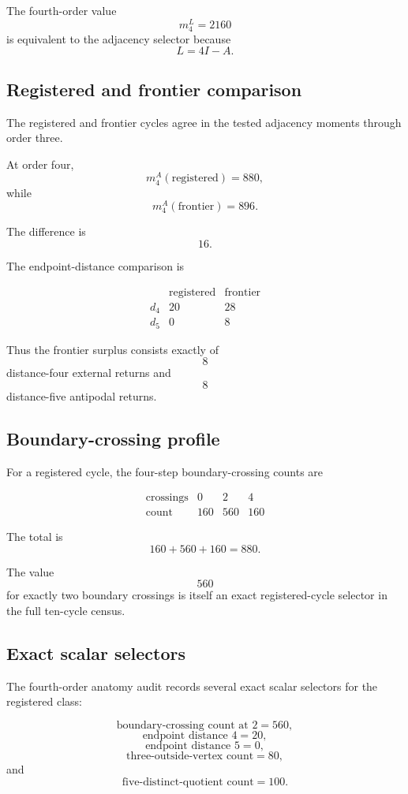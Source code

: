 The fourth-order value
\[
m_4^L=2160
\]
is equivalent to the adjacency selector because
\[
L=4I-A.
\]

\subsection{Registered and frontier comparison}

The registered and frontier cycles agree in the tested adjacency
moments through order three.

At order four,
\[
m_4^A(\text{registered})=880,
\]
while
\[
m_4^A(\text{frontier})=896.
\]

The difference is
\[
16.
\]

The endpoint-distance comparison is

\[
\begin{array}{c|rr}
 & \text{registered} & \text{frontier}\\
\hline
d_4 & 20 & 28\\
d_5 & 0 & 8
\end{array}
\]

Thus the frontier surplus consists exactly of
\[
8
\]
distance-four external returns and
\[
8
\]
distance-five antipodal returns.

\subsection{Boundary-crossing profile}

For a registered cycle, the four-step boundary-crossing counts are

\[
\begin{array}{c|rrr}
\text{crossings} & 0 & 2 & 4\\
\hline
\text{count} & 160 & 560 & 160
\end{array}
\]

The total is
\[
160+560+160=880.
\]

The value
\[
560
\]
for exactly two boundary crossings is itself an exact registered-cycle
selector in the full ten-cycle census.

\subsection{Exact scalar selectors}

The fourth-order anatomy audit records several exact scalar selectors
for the registered class:

\[
\text{boundary-crossing count at }2=560,
\]
\[
\text{endpoint distance }4=20,
\]
\[
\text{endpoint distance }5=0,
\]
\[
\text{three-outside-vertex count}=80,
\]
and
\[
\text{five-distinct-quotient count}=100.
\]

